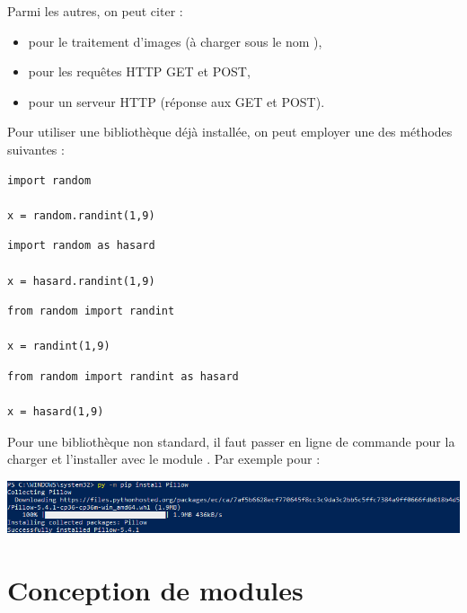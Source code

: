 Parmi les autres, on peut citer :

\begin{itemize}
	\item {} pour le traitement d'images (à charger sous le nom ),
	\item {} pour les requêtes HTTP GET et POST,
	\item {} pour un serveur HTTP (réponse aux GET et POST).
\end{itemize}

\medskip

Pour utiliser une bibliothèque déjà installée, on peut employer une des méthodes suivantes :

\begin{multicols}{2}
\begin{verbatim}
import random

x = random.randint(1,9)
\end{verbatim}

\begin{verbatim}
import random as hasard

x = hasard.randint(1,9)
\end{verbatim}

\begin{verbatim}
from random import randint

x = randint(1,9)
\end{verbatim}

\begin{verbatim}
from random import randint as hasard

x = hasard(1,9)
\end{verbatim}
\end{multicols}

\medskip

Pour une bibliothèque non standard, il faut passer en ligne de commande pour la charger et l'installer avec le module . Par exemple pour  :

\noindent\includegraphics[width=\textwidth]{images/installPillow.png}

\section{Conception de modules}

